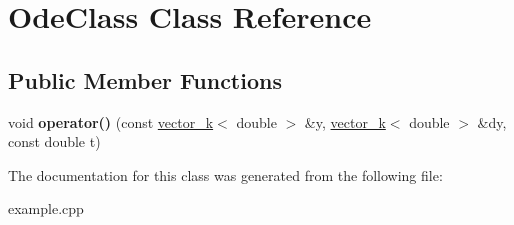 \hypertarget{class_ode_class}{\section{Ode\-Class Class Reference}
\label{class_ode_class}
}
\subsection*{Public Member Functions}
\begin{DoxyCompactItemize}
\item 
\hypertarget{class_ode_class_a60e726a29e90b8531f8772ab7de04df3}{void {\bfseries operator()} (const \hyperlink{classkeycpp_1_1vector__k}{vector\-\_\-k}$<$ double $>$ \&y, \hyperlink{classkeycpp_1_1vector__k}{vector\-\_\-k}$<$ double $>$ \&dy, const double t)}\label{class_ode_class_a60e726a29e90b8531f8772ab7de04df3}

\end{DoxyCompactItemize}


The documentation for this class was generated from the following file\-:\begin{DoxyCompactItemize}
\item 
example.\-cpp\end{DoxyCompactItemize}
